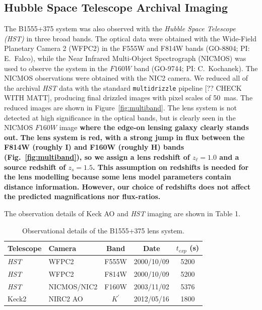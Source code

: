 \documentclass[useAMS,usenatbib]{mnras}
\begin{document}
\subsection{Hubble Space Telescope Archival Imaging}

The B1555+375 system was also observed with the \textit{Hubble Space Telescope
(\textit{HST})} in three broad bands.  The optical data were obtained with the
Wide-Field Planetary Camera 2 (WFPC2) in the F555W and F814W bands
(GO-8804; PI: E.\ Falco), while the Near Infrared Multi-Object
Spectrograph (NICMOS) was used to observe the system in the $F160W$
band (GO-9744; PI: C.\ Kochanek).  The NICMOS observations were
obtained with the NIC2 camera.  We reduced all of the archival \textit{HST}
data with the standard {\tt multidrizzle} pipeline [?? CHECK WITH
  MATT], producing final drizzled images with pixel scales of 50~mas.
The reduced images are shown in Figure~\ref{fig:multiband}.  The lens
system is not detected at high significance in the optical bands, but
is clearly seen in the NICMOS $F160W$ image \textbf{where the edge-on lensing
galaxy clearly stands out.}
\textbf{The lens system is red, with a strong jump in flux between the F814W
(roughly I) and F160W (roughly H) bands (Fig.~\ref{fig:multiband}), so 
we assign a lens redshift of $z_\ell = 1.0$ and a source redshift of
$z_s =1.5$. This assumption on redshifts is needed for the lens modelling because some lens model parameters contain distance information. However, our choice of redshifts does not affect the predicted magnifications nor flux-ratios.} 

The observation details of Keck AO and \textit{HST} imaging are shown in Table 1.

\begin{table}
 \centering
  \caption{Observational details of the B1555+375 lens system.}
  \begin{tabular}{@{}llccc}
  
\hline
  Telescope     &      Camera     &  Band & Date &$t_{exp}$ (s) \\

 \hline
   \textit{HST}				&		WFPC2    &  F555W		&	2000/10/09 	&	5200\\
   \textit{HST}				&		WFPC2    &  F814W		&	2000/10/09 &	5200\\
   \textit{HST}				&		NICMOS/NIC2	&	F160W	&	2003/11/02 & 5376\\
   Keck2			&		NIRC2 AO	&   $K^\prime$	& 2012/05/16	&  1800\\
   \hline
\end{tabular}
\end{table}
\end{document}
